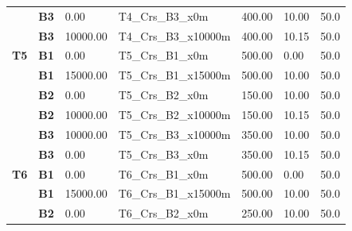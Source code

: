 \begin{longtable}{|p{13.5mm}|p{10.5mm}|p{16.0mm}|p{26.0mm}|p{12.5mm}|p{16.0mm}|p{19.5mm}|}
                                               & \scriptsize\textbf{B3} & \scriptsize{0.00}     & \scriptsize{T4\_Crs\_B3\_x0m}     & \scriptsize{400.00}  & \scriptsize{10.00} & \scriptsize{50.0} \\
                                               & \scriptsize\textbf{B3} & \scriptsize{10000.00} & \scriptsize{T4\_Crs\_B3\_x10000m} & \scriptsize{400.00}  & \scriptsize{10.15} & \scriptsize{50.0} \\
\hline
\scriptsize\textcolor[rgb]{1,0,0}{\textbf{T5}} & \scriptsize\textbf{B1} & \scriptsize{0.00}     & \scriptsize{T5\_Crs\_B1\_x0m}     & \scriptsize{500.00}  & \scriptsize{0.00}  & \scriptsize{50.0} \\
                                               & \scriptsize\textbf{B1} & \scriptsize{15000.00} & \scriptsize{T5\_Crs\_B1\_x15000m} & \scriptsize{500.00}  & \scriptsize{10.00} & \scriptsize{50.0} \\
                                               & \scriptsize\textbf{B2} & \scriptsize{0.00}     & \scriptsize{T5\_Crs\_B2\_x0m}     & \scriptsize{150.00}  & \scriptsize{10.00} & \scriptsize{50.0} \\
                                               & \scriptsize\textbf{B2} & \scriptsize{10000.00} & \scriptsize{T5\_Crs\_B2\_x10000m} & \scriptsize{150.00}  & \scriptsize{10.15} & \scriptsize{50.0} \\
                                               & \scriptsize\textbf{B3} & \scriptsize{10000.00} & \scriptsize{T5\_Crs\_B3\_x10000m} & \scriptsize{350.00}  & \scriptsize{10.00} & \scriptsize{50.0} \\
                                               & \scriptsize\textbf{B3} & \scriptsize{0.00}     & \scriptsize{T5\_Crs\_B3\_x0m}     & \scriptsize{350.00}  & \scriptsize{10.15} & \scriptsize{50.0} \\
\hline
\scriptsize\textcolor[rgb]{1,0,0}{\textbf{T6}} & \scriptsize\textbf{B1} & \scriptsize{0.00}     & \scriptsize{T6\_Crs\_B1\_x0m}     & \scriptsize{500.00}  & \scriptsize{0.00}  & \scriptsize{50.0} \\
                                               & \scriptsize\textbf{B1} & \scriptsize{15000.00} & \scriptsize{T6\_Crs\_B1\_x15000m} & \scriptsize{500.00}  & \scriptsize{10.00} & \scriptsize{50.0} \\
                                               & \scriptsize\textbf{B2} & \scriptsize{0.00}     & \scriptsize{T6\_Crs\_B2\_x0m}     & \scriptsize{250.00}  & \scriptsize{10.00} & \scriptsize{50.0} \\

\end{longtable}
